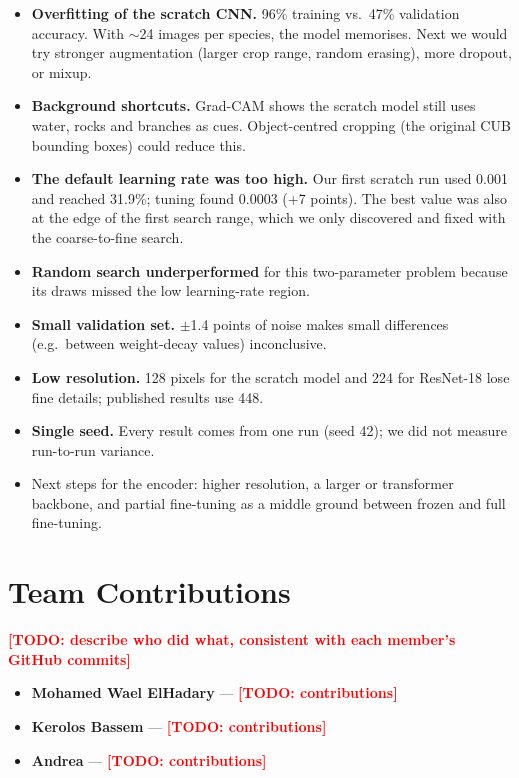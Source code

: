 \documentclass[11pt,a4paper]{article}
\newcommand{\todo}[1]{\textcolor{red}{\textbf{[TODO: #1]}}}
\begin{document}
\begin{itemize}
  \item \textbf{Overfitting of the scratch CNN.} 96\% training vs.\ 47\%
        validation accuracy. With $\sim$24 images per species, the model
        memorises. Next we would try stronger augmentation (larger crop range,
        random erasing), more dropout, or mixup.
  \item \textbf{Background shortcuts.} Grad-CAM shows the scratch model still
        uses water, rocks and branches as cues. Object-centred cropping (the
        original CUB bounding boxes) could reduce this.
  \item \textbf{The default learning rate was too high.} Our first scratch run
        used 0.001 and reached 31.9\%; tuning found 0.0003 (+7 points). The
        best value was also at the edge of the first search range, which we
        only discovered and fixed with the coarse-to-fine search.
  \item \textbf{Random search underperformed} for this two-parameter problem
        because its draws missed the low learning-rate region.
  \item \textbf{Small validation set.} $\pm$1.4 points of noise makes small
        differences (e.g.\ between weight-decay values) inconclusive.
  \item \textbf{Low resolution.} 128 pixels for the scratch model and 224 for
        ResNet-18 lose fine details; published results use 448.
  \item \textbf{Single seed.} Every result comes from one run (seed 42); we did
        not measure run-to-run variance.
  \item Next steps for the encoder: higher resolution, a larger or
        transformer backbone, and partial fine-tuning as a middle ground
        between frozen and full fine-tuning.
\end{itemize}

\section{Team Contributions}

\todo{describe who did what, consistent with each member's GitHub commits}

\begin{itemize}
  \item \textbf{Mohamed Wael ElHadary} --- \todo{contributions}
  \item \textbf{Kerolos Bassem} --- \todo{contributions}
  \item \textbf{Andrea} --- \todo{contributions}
\end{itemize}
\end{document}

